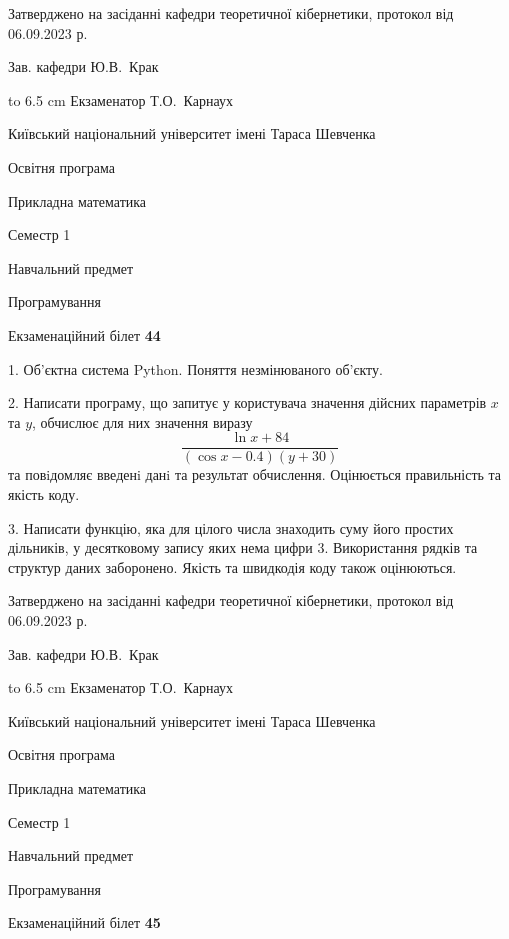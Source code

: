 \documentclass[12pt, ukrainian]{article}
\begin{document}
{\smallskip\smallskip \begin {scriptsize} Затверджено на засіданні кафедри теоретичної кібернетики, протокол   від   06.09.2023 р.\par\smallskip\smallskip\smallskip\smallskip
{\parbox {6.5 cm} {Зав. кафедри \dotfill Ю.В.~Крак}}\hspace {0.7cm} {\hbox to 6.5 cm { Екзаменатор \dotfill Т.О.~Карнаух}} \end{scriptsize}}
\vspace{0.9cm}
{{\begin {scriptsize}\par
{ \center  Київський національний університет імені Тараса Шевченка \par}
{\parbox {5 cm}{Освітня програма \hfill}{\parbox {7 cm}{Прикладна математика\hfill}}\parbox {6 cm}{\hfill Семестр 1}}\par
{\parbox {5 cm} {Навчальний предмет \hfill}\parbox {7 cm}{Програмування \hfill}\parbox {6cm}{\hfill}\par}\vspace{-15pt} \end{scriptsize}}{\center Екзаменаційний білет \No \textbf { 44 }\par}}
{%
1. Об’єктна система Python. Поняття незмінюваного об'єкту.%
\par
2. Написати програму, що запитує у користувача значення дійсних параметрів $x$ та $y$, обчислює для них значення виразу 
$$\frac{\ln x + 84}{(\cos x - 0.4) (y + 30)}$$ 
та повiдомляє введенi данi та результат обчислення.
 Оцінюється правильність та якість коду.

\par
3. Написати функцію, яка для цілого числа знаходить суму його простих дільників, у десятковому запису яких нема цифри 3.  Використання рядків та структур даних заборонено. Якість та швидкодія коду також оцінюються. 

}
{\smallskip\smallskip \begin {scriptsize} Затверджено на засіданні кафедри теоретичної кібернетики, протокол   від   06.09.2023 р.\par\smallskip\smallskip\smallskip\smallskip
{\parbox {6.5 cm} {Зав. кафедри \dotfill Ю.В.~Крак}}\hspace {0.7cm} {\hbox to 6.5 cm { Екзаменатор \dotfill Т.О.~Карнаух}} \end{scriptsize}}
\vspace{0.9cm}
{{\begin {scriptsize}\par
{ \center  Київський національний університет імені Тараса Шевченка \par}
{\parbox {5 cm}{Освітня програма \hfill}{\parbox {7 cm}{Прикладна математика\hfill}}\parbox {6 cm}{\hfill Семестр 1}}\par
{\parbox {5 cm} {Навчальний предмет \hfill}\parbox {7 cm}{Програмування \hfill}\parbox {6cm}{\hfill}\par}\vspace{-15pt} \end{scriptsize}}{\center Екзаменаційний білет \No \textbf { 45 }\par}}
\end{document}
